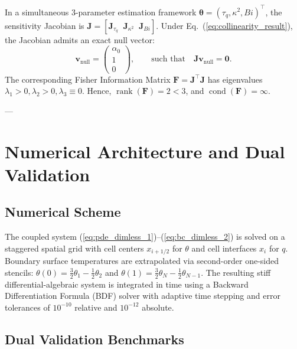 \documentclass[review,12pt]{article}
\begin{document}
In a simultaneous 3-parameter estimation framework $\bm{\theta} = (\tau_q, \kappa^2, Bi)^\top$, the sensitivity Jacobian is $\bm{J} = [\bm{J}_{\tau_q} \;\; \bm{J}_{\kappa^2} \;\; \bm{J}_{Bi}]$. Under Eq.~(\ref{eq:collinearity_result}), the Jacobian admits an exact null vector:
\begin{equation}
\bm{v}_{\mathrm{null}} = \begin{pmatrix} \alpha_0 \\ 1 \\ 0 \end{pmatrix}, \qquad \text{such that} \quad \bm{J} \bm{v}_{\mathrm{null}} = \bm{0}.
\label{eq:null_vector}
\end{equation}
The corresponding Fisher Information Matrix $\bm{F} = \bm{J}^\top \bm{J}$ has eigenvalues $\lambda_1 > 0, \lambda_2 > 0, \lambda_3 \equiv 0$. Hence, $\operatorname{rank}(\bm{F}) = 2 < 3$, and $\operatorname{cond}(\bm{F}) = \infty$.

---

\section{Numerical Architecture and Dual Validation}

\subsection{Numerical Scheme}

The coupled system (\ref{eq:pde_dimless_1})--(\ref{eq:bc_dimless_2}) is solved on a staggered spatial grid with cell centers $x_{i+1/2}$ for $\theta$ and cell interfaces $x_i$ for $q$. Boundary surface temperatures are extrapolated via second-order one-sided stencils: $\theta(0) = \frac{3}{2}\theta_1 - \frac{1}{2}\theta_2$ and $\theta(1) = \frac{3}{2}\theta_N - \frac{1}{2}\theta_{N-1}$. The resulting stiff differential-algebraic system is integrated in time using a Backward Differentiation Formula (BDF) solver with adaptive time stepping and error tolerances of $10^{-10}$ relative and $10^{-12}$ absolute.

\subsection{Dual Validation Benchmarks}
\end{document}
